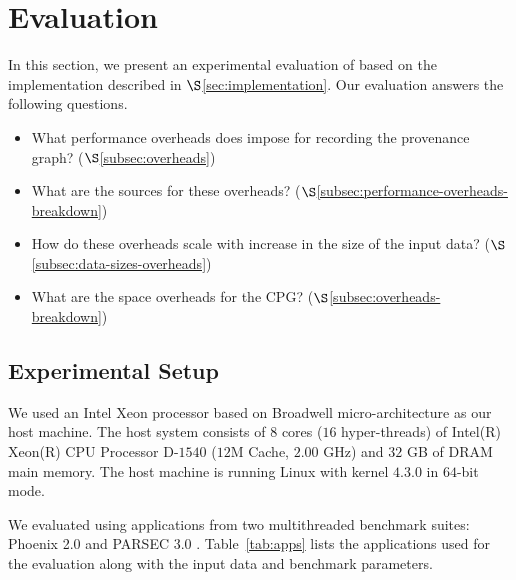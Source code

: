 
\section{Evaluation}
\label{sec:evaluation}
In this section, we present an experimental evaluation of \projecttitle based on the implementation described in  $\S$\ref{sec:implementation}. 
Our evaluation answers the following questions.



\begin{itemize}
\item What performance overheads does \projecttitle impose for recording the provenance graph? ($\S$\ref{subsec:overheads})
\item What are the sources for these overheads? ($\S$\ref{subsec:performance-overheads-breakdown})
\item How do these overheads scale with increase in the size of the input data? ($\S$\ref{subsec:data-sizes-overheads})
\item What are the space overheads for the CPG? ($\S$\ref{subsec:overheads-breakdown})
\end{itemize}


\subsection{Experimental Setup}


 We used an Intel Xeon processor based on Broadwell micro-architecture
as our host machine. The
host system consists of $8$ cores ($16$ hyper-threads) of Intel(R) Xeon(R) CPU Processor D-$1540$
($12$M Cache, $2.00$ GHz) and $32$ GB of DRAM main memory. The host
machine is running Linux with kernel $4.3.0$ in $64$-bit mode. 



  We evaluated \projecttitle using applications from two multithreaded benchmark suites: Phoenix 2.0 \cite{phoenix} and PARSEC 3.0 \cite{parsec}. Table~\ref{tab:apps} lists the applications used for the evaluation along with the input data and benchmark parameters.
%


